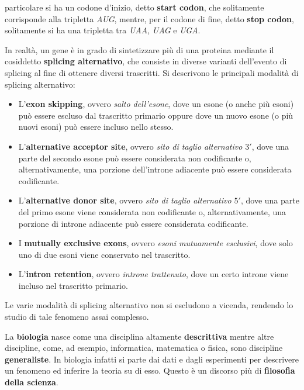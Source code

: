 \documentclass[a4paper,12pt, oneside]{book}
\begin{document}
\begin{shaded}
\begin{enumerate}
    particolare si ha un codone d'inizio, detto \textbf{start codon}, che
    solitamente corrisponde alla tripletta \textit{AUG}, mentre, per il codone
    di 
    fine, detto \textbf{stop codon}, solitamente si ha una tripletta tra
    \textit{UAA}, \textit{UAG} e  \textit{UGA}.
  \end{enumerate}
  In realtà, un gene è in grado di sintetizzare più di una proteina
  mediante il cosiddetto \textbf{splicing alternativo}, che consiste in diverse
  varianti dell'evento di splicing al fine di ottenere diversi trascritti. Si
  descrivono le principali modalità di splicing alternativo:
  \begin{itemize}
    \item L'\textbf{exon skipping}, ovvero \textit{salto dell'esone}, dove un
    esone 
    (o anche più esoni) può essere escluso dal trascritto primario oppure dove
    un 
    nuovo esone (o più nuovi esoni) può essere incluso nello stesso. 
    \item L'\textbf{alternative acceptor site}, ovvero \textit{sito di taglio
      alternativo $3'$}, dove una parte del secondo esone può essere considerata
    non codificante o, alternativamente, una porzione dell'introne adiacente può
    essere considerata codificante.
    \item L'\textbf{alternative donor site}, ovvero \textit{sito di taglio
      alternativo $5'$}, dove una parte del primo esone viene considerata non
    codificante o, alternativamente, una porzione di introne adiacente può
    essere considerata codificante.
    \item I \textbf{mutually exclusive exons}, ovvero \textit{esoni mutuamente
      esclusivi}, dove solo uno di due esoni viene conservato nel trascritto.
    \item L'\textbf{intron retention}, ovvero \textit{introne trattenuto}, dove
    un 
    certo introne viene incluso nel trascritto primario.
  \end{itemize}
  Le varie modalità di splicing alternativo non si escludono a vicenda, rendendo
  lo studio di tale fenomeno assai complesso.
\end{shaded}
La \textbf{biologia} nasce come una disciplina altamente \textbf{descrittiva}
mentre altre discipline, come, ad esempio, informatica, matematica o fisica,
sono discipline \textbf{generaliste}. In biologia infatti si parte dai dati e
dagli esperimenti per descrivere un fenomeno ed inferire la teoria su di
esso. Questo è un discorso più di \textbf{filosofia della scienza}.\\
\end{document}
